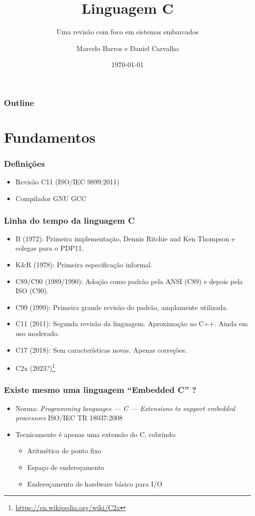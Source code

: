 \documentclass{beamer}
\title{Linguagem C}
\subtitle{Uma revisão com foco em sistemas embarcados}
\author{Marcelo Barros e Daniel Carvalho}
\institute{UFU/FEELT}
\date{\today}
\begin{document}
\begin{frame}
\titlepage
\end{frame}

\begin{frame}
\frametitle{Outline}
\tableofcontents
\end{frame}

\section{Fundamentos}

\begin{frame}
	\frametitle{Definições}
	\begin{itemize}
		\item Revisão C11 (ISO/IEC 9899:2011)
		\item Compilador GNU GCC
	\end{itemize}
\end{frame}

\begin{frame}
	\frametitle{Linha do tempo da linguagem C}
	\begin{itemize}
		\item B (1972): Primeira implementação, Dennis Ritchie and Ken Thompson e colegas para o PDP11.
		\item K\&R (1978): Primeira especificação informal.
		\item C89/C90 (1989/1990): Adoção como padrão pela ANSI (C89) e depois pela ISO (C90).
		\item C99 (1999): Primeira grande revisão do padrão, amplamente utilizada.
		\item C11 (2011): Segunda revisão da linguagem. Aproximação ao C++. Ainda em uso moderado.
		\item C17 (2018): Sem características novas. Apenas correções.
		\item C2x (2023?)\footnote{\url{https://en.wikipedia.org/wiki/C2x}}
	\end{itemize}
\end{frame}

\begin{frame}
	\frametitle{Existe mesmo uma linguagem ``Embedded C'' ?}
	\begin{itemize}
		\item Norma: \textit{Programming languages — C — Extensions to support embedded processors}
		ISO/IEC TR 18037:2008
		\item Tecnicamente é apenas uma extensão do C, cobrindo:
	\begin{itemize}
		\item Aritmética de ponto fixo
		\item Espaço de endereçamento
		\item Endereçamento de hardware básico para I/O
	\end{itemize}
	\end{itemize}
\end{frame}
\end{document}
